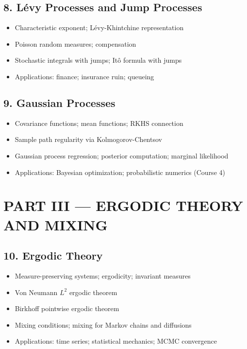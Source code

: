 \subsection{8. L\'evy Processes and Jump Processes}
\begin{itemize}
\item Characteristic exponent; L\'evy-Khintchine representation
\item Poisson random measures; compensation
\item Stochastic integrals with jumps; It\^o formula with jumps
\item Applications: finance; insurance ruin; queueing
\end{itemize}

\subsection{9. Gaussian Processes}
\begin{itemize}
\item Covariance functions; mean functions; RKHS connection
\item Sample path regularity via Kolmogorov-Chentsov
\item Gaussian process regression; posterior computation; marginal likelihood
\item Applications: Bayesian optimization; probabilistic numerics (Course 4)
\end{itemize}

\section{PART III --- ERGODIC THEORY AND MIXING}

\subsection{10. Ergodic Theory}
\begin{itemize}
\item Measure-preserving systems; ergodicity; invariant measures
\item Von Neumann $L^2$ ergodic theorem
\item Birkhoff pointwise ergodic theorem
\item Mixing conditions; mixing for Markov chains and diffusions
\item Applications: time series; statistical mechanics; MCMC convergence
\end{itemize}

